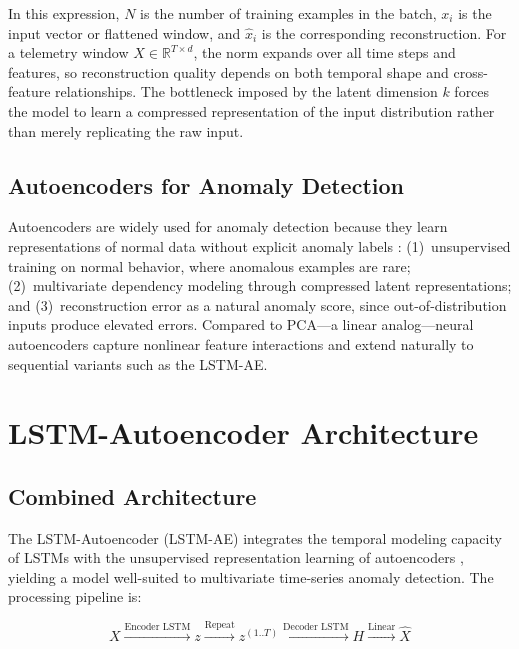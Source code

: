 In this expression, $N$ is the number of training examples in the batch,
$x_i$ is the input vector or flattened window, and $\hat{x}_i$ is the
corresponding reconstruction. For a telemetry window
$X \in \mathbb{R}^{T \times d}$, the norm expands over all time steps and
features, so reconstruction quality depends on both temporal shape and
cross-feature relationships. The bottleneck imposed by the latent dimension
$k$ forces the model to learn a compressed representation of the input
distribution rather than merely replicating the raw input.

\subsection{Autoencoders for Anomaly Detection}
\label{subsec:ae_why}

Autoencoders are widely used for anomaly detection because they learn
representations of normal data without explicit anomaly labels
\cite{chalapathy2019deep, pang2021deep}: (1)~unsupervised training on normal
behavior, where anomalous examples are rare; (2)~multivariate dependency
modeling through compressed latent representations; and (3)~reconstruction
error as a natural anomaly score, since out-of-distribution inputs produce
elevated errors. Compared to PCA---a linear analog---neural autoencoders
capture nonlinear feature interactions \cite{jolliffe2016pca} and extend
naturally to sequential variants such as the LSTM-AE.

\section{LSTM-Autoencoder Architecture}
\label{sec:lstm_ae}

\subsection{Combined Architecture}
\label{subsec:lstm_ae_architecture}

The LSTM-Autoencoder (LSTM-AE) integrates the temporal modeling capacity of LSTMs with
the unsupervised representation learning of autoencoders
\cite{malhotra2015lstm, chalapathy2019deep}, yielding a model well-suited to multivariate
time-series anomaly detection. The processing pipeline is:

\begin{equation}
    X \xrightarrow{\text{Encoder LSTM}} z \xrightarrow{\text{Repeat}}
    z^{(1..T)} \xrightarrow{\text{Decoder LSTM}} H
    \xrightarrow{\text{Linear}} \hat{X}
    \label{eq:lstm_ae_pipeline}
\end{equation}


